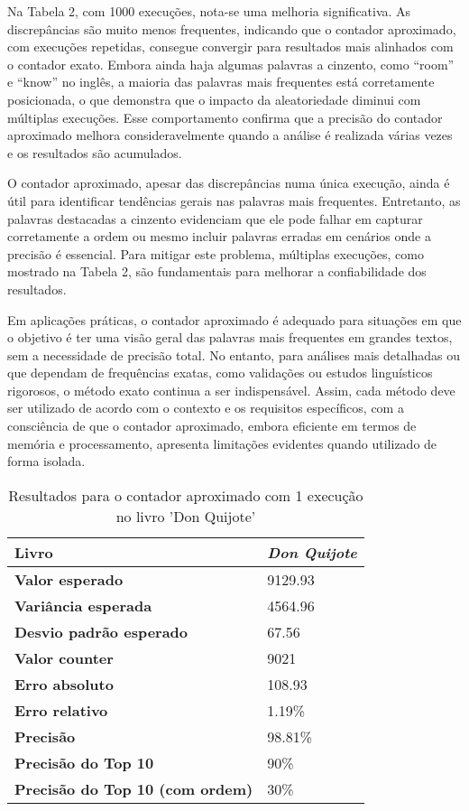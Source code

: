 \documentclass[shortpaper, portugues, times, mirror]{revdetua}
\begin{document}
Na Tabela 2, com 1000 execuções, nota-se uma melhoria significativa. As discrepâncias são muito menos frequentes, indicando que o contador aproximado, com execuções repetidas, consegue convergir para resultados mais alinhados com o contador exato. Embora ainda haja algumas palavras a cinzento, como “room” e “know” no inglês, a maioria das palavras mais frequentes está corretamente posicionada, o que demonstra que o impacto da aleatoriedade diminui com múltiplas execuções. Esse comportamento confirma que a precisão do contador aproximado melhora consideravelmente quando a análise é realizada várias vezes e os resultados são acumulados.

O contador aproximado, apesar das discrepâncias numa única execução, ainda é útil para identificar tendências gerais nas palavras mais frequentes. Entretanto, as palavras destacadas a cinzento evidenciam que ele pode falhar em capturar corretamente a ordem ou mesmo incluir palavras erradas em cenários onde a precisão é essencial. Para mitigar este problema, múltiplas execuções, como mostrado na Tabela 2, são fundamentais para melhorar a confiabilidade dos resultados.

Em aplicações práticas, o contador aproximado é adequado para situações em que o objetivo é ter uma visão geral das palavras mais frequentes em grandes textos, sem a necessidade de precisão total. No entanto, para análises mais detalhadas ou que dependam de frequências exatas, como validações ou estudos linguísticos rigorosos, o método exato continua a ser indispensável. Assim, cada método deve ser utilizado de acordo com o contexto e os requisitos específicos, com a consciência de que o contador aproximado, embora eficiente em termos de memória e processamento, apresenta limitações evidentes quando utilizado de forma isolada.

\begin{table}[H]
\centering
\begin{tabular}{|l|l|}
\hline
\textbf{Livro}            & \textit{Don Quijote} \\ \hline
\textbf{Valor esperado}         & 9129.93\\ \hline
\textbf{Variância esperada}       & 4564.96\\ \hline
\textbf{Desvio padrão esperado}   & 67.56\\ \hline
\hline
\textbf{Valor counter}   & 9021\\ \hline
\textbf{Erro absoluto}   & 108.93\\ \hline
\textbf{Erro relativo}   & 1.19\%\\ \hline
\textbf{Precisão}   & 98.81\%\\ \hline
\textbf{Precisão do Top 10}   & 90\%\\ \hline
\textbf{Precisão do Top 10 (com ordem)}   & 30\%\\ \hline
\end{tabular}
\caption{Resultados para o contador aproximado com 1 execução no livro 'Don Quijote'}
\label{tab:approximate}
\end{table}
\end{document}

